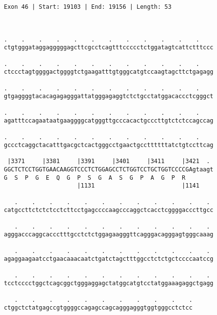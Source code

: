 \documentclass{article}
\begin{document}
\begin{Verbatim}
Exon 46 | Start: 19103 | End: 19156 | Length: 53



.    .    .    .    .    .    .    .    .    .    .    .    
ctgtgggataggagggggagcttcgcctcagtttccccctctggatagtcattctttccc
                                                            
.    .    .    .    .    .    .    .    .    .    .    .    
ctccctagtggggactggggtctgaagatttgtgggcatgtccaagtagcttctgagagg
                                                            
.    .    .    .    .    .    .    .    .    .    .    .    
gtgaggggtacacagagagggattatgggagaggtctctgcctatggacaccctcgggct
                                                            
.    .    .    .    .    .    .    .    .    .    .    .    
agatttccagaataatgaaggggcatgggttgcccacactgcccttgtctctccagccag
                                                            
.    .    .    .    .    .    .    .    .    .    .    .    
gccctcaggctacatttgacgctcactgggcctgaactgccttttttatctgtccttcag
                                                            
 |3371     |3381     |3391     |3401     |3411     |3421  . 
GGCTCTCCTGGTGAACAAGGTCCCTCTGGAGCCTCTGGTCCTGCTGGTCCCCGAgtaagt
G  S  P  G  E  Q  G  P  S  G  A  S  G  P  A  G  P  R        
                     |1131                         |1141    
  
   .    .    .    .    .    .    .    .    .    .    .    . 
catgccttctctctcctcttcctgagccccaagcccaggctcacctcggggacccttgcc
                                                            
   .    .    .    .    .    .    .    .    .    .    .    . 
agggacccaggcaccctttgcctctctggagaagggttcagggacagggagtgggcaaag
                                                            
   .    .    .    .    .    .    .    .    .    .    .    . 
agaggaagaatcctgaacaaacaatctgatctagctttggcctctctgctccccaatccg
                                                            
   .    .    .    .    .    .    .    .    .    .    .    . 
tcctcccctggctcagcggctgggaggagctatggcatgtcctatggaaagaggctgagg
                                                            
   .    .    .    .    .    .    .    .    .    .    .
ctggctctatgagccgtggggccagagccagcagggagggtggtgggcctctcc
                                                      

\end{Verbatim}
\end{document}
